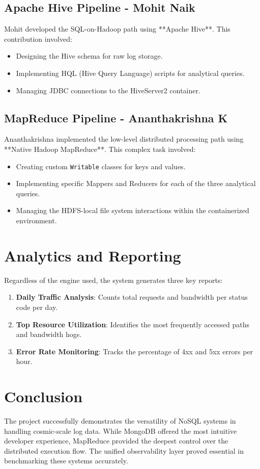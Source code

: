 \documentclass[a4paper,12pt]{article}
\begin{document}
\subsection{Apache Hive Pipeline - Mohit Naik}
Mohit developed the SQL-on-Hadoop path using **Apache Hive**. This contribution involved:
\begin{itemize}
    \item Designing the Hive schema for raw log storage.
    \item Implementing HQL (Hive Query Language) scripts for analytical queries.
    \item Managing JDBC connections to the HiveServer2 container.
\end{itemize}

\subsection{MapReduce Pipeline - Ananthakrishna K}
Ananthakrishna implemented the low-level distributed processing path using **Native Hadoop MapReduce**. This complex task involved:
\begin{itemize}
    \item Creating custom \texttt{Writable} classes for keys and values.
    \item Implementing specific Mappers and Reducers for each of the three analytical queries.
    \item Managing the HDFS-local file system interactions within the containerized environment.
\end{itemize}

\section{Analytics and Reporting}
Regardless of the engine used, the system generates three key reports:
\begin{enumerate}
    \item \textbf{Daily Traffic Analysis}: Counts total requests and bandwidth per status code per day.
    \item \textbf{Top Resource Utilization}: Identifies the most frequently accessed paths and bandwidth hogs.
    \item \textbf{Error Rate Monitoring}: Tracks the percentage of 4xx and 5xx errors per hour.
\end{enumerate}

\section{Conclusion}
The project successfully demonstrates the versatility of NoSQL systems in handling cosmic-scale log data. While MongoDB offered the most intuitive developer experience, MapReduce provided the deepest control over the distributed execution flow. The unified observability layer proved essential in benchmarking these systems accurately.
\end{document}
